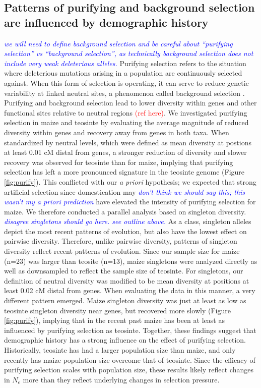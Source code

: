 \documentclass{pnastwo}
\newcommand{\jri}[1]{\textcolor{blue}{\emph{#1}} }
\begin{document}
\begin{article}
\subsection{Patterns of purifying and background selection are
  influenced by demographic history}
 \jri{we will need to define background selection and be careful about ``purifying selection'' vs ``background selection'', as technically background selection does not include very weak deleterious alleles.}
Purifying selection refers to the situation where deleterious mutations arising in a population are continuously selected against.
When this form of selection is operating, it can serve to reduce genetic variability at linked neutral sites, a phenomenon called background selection \cite{charlesworth1993}. Purifying and background selection lead to lower diversity within genes and other functional sites relative to neutral regions \textcolor{red}{(ref here)}.
We investigated purifying selection in maize and teosinte by evaluating the average magnitude of reduced diversity within genes and recovery away from genes in both taxa.
When standardized by neutral levels, which were defined as mean diversity at postions at least 0.01 cM distal
from genes, a stronger reduction of diversity and slower recovery was observed for teosinte than for maize, implying that purifying selection has left a more pronounced signature in the teosinte genome (Figure \ref{fig:purify}).
This conflicted with our \emph{a priori} hypothesis;
we expected that strong artificial selection since domestication may \jri{don't think we should say this; this wasn't my a priori prediction}
have elevated the intensity of purifying selection for maize.
We therefore conducted a parallel analysis based on singleton diversity. \jri{disagree singletons should go here. see outline above.}
As a class, singleton alleles depict the most recent patterns of evolution, but
also have the lowest effect on pairwise diversity. Therefore, unlike
pairwise diversity, patterns of singleton
diversity reflect recent patterns of evolution. Since our sample size
for maize (n=23) was larger than teosite (n=13), maize singletons were
analyzed directly as well as downsampled to reflect the sample size of
teosinte. For singletons, our definition of
neutral diversity was modified to be mean diversity at positions at
least 0.02 cM distal from genes. When
evaluating the data in this manner, a very different pattern
emerged. Maize singleton diversity was just at least as low as teosinte singleton
diversity near genes, but recovered more slowly
(Figure \ref{fig:purify}), implying that in the
recent past maize has been at least as influenced by purifying selection as
teosinte. Together, these findings suggest that demographic history has
a strong influence on the effect of purifying selection. Historically,
teosinte has had a larger population size than maize, and only
recently has maize population size overcome that of teosinte. Since
the efficacy of purifying selection scales with population size,
these results likely reflect changes in $N_e$ more than they reflect
underlying changes in selection pressure.



\end{article}
\end{document}
